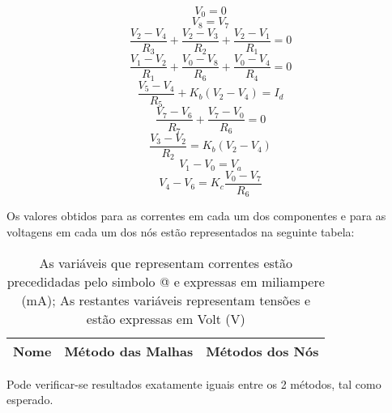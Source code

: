 \begin {equation}
	V_0 = 0
	\label{eq1}
\end{equation}
\begin {equation}
	V_8 = V_7
	\label{eqn}
\end{equation}
\begin {equation}
	\frac{V_2-V_4}{R_3} + \frac{V_2-V_3}{R_2} + \frac{V_2-V_1}{R_1} = 0
	\label{eq4}
\end{equation}
\begin {equation}
	\frac{V_1-V_2}{R_1} + \frac{V_0 - V_8}{R_6} + \frac{V_0 - V_4}{R_4} = 0
	\label{eq3}
\end{equation}
\begin {equation}
	\frac{V_5-V_4}{R_5} + K_b(V_2-V_4) = I_d
	\label{eq6}
\end{equation}
\begin {equation}
	\frac{V_7-V_6}{R_7} + \frac{V_7 - V_0}{R_6} = 0
	\label{eq7}
\end{equation}
\begin {equation}
	\frac{V_3-V_2}{R_2} = K_b(V_2-V_4) 
	\label{eq5}
\end{equation}
\begin {equation}
	V_1 - V_0 = V_a
	\label{eq8}
\end{equation}
\begin {equation}
	V_4 - V_6 = K_c \frac{V_0 - V_7}{R_6}
	\label{eq9}
\end{equation}

Os valores obtidos para as correntes em cada um dos componentes e para as voltagens em cada um dos nós estão representados na seguinte tabela:
 \pagebreak 
\begin{table}[h]
  \centering
  \begin{tabular}{|l|r|r|}
    \hline    
    {\bf Nome} & {\bf Método das Malhas} & {\bf Métodos dos Nós}\\ \hline
    
  \end{tabular}
  \caption{As variáveis que representam correntes estão precedidadas pelo simbolo @ e expressas em miliampere (mA); As restantes variáveis representam tensões e estão expressas em Volt (V)}
  \label{tab:valores_teoricos}
\end{table}

Pode verificar-se resultados exatamente iguais entre os 2 métodos, tal como esperado.


